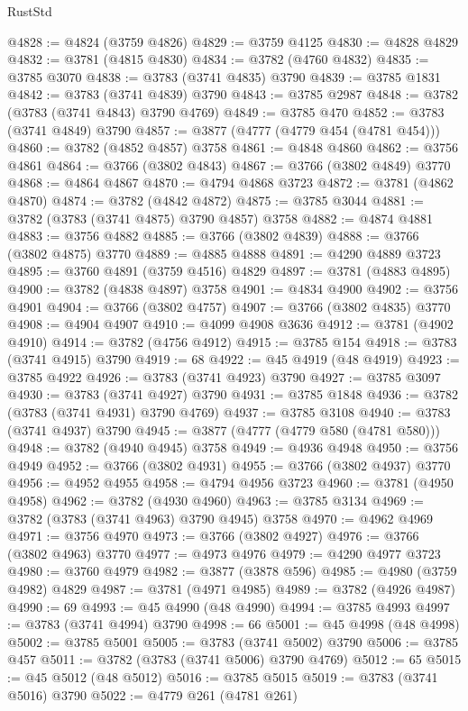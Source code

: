 \begin{lexlean}{RustStd}
\begin{coremodule}
@4828 := @4824 (@3759 @4826)
@4829 := @3759 @4125
@4830 := @4828 @4829
@4832 := @3781 (@4815 @4830)
@4834 := @3782 (@4760 @4832)
@4835 := @3785 @3070
@4838 := @3783 (@3741 @4835) @3790
@4839 := @3785 @1831
@4842 := @3783 (@3741 @4839) @3790
@4843 := @3785 @2987
@4848 := @3782 (@3783 (@3741 @4843) @3790 @4769)
@4849 := @3785 @470
@4852 := @3783 (@3741 @4849) @3790
@4857 := @3877 (@4777 (@4779 @454 (@4781 @454)))
@4860 := @3782 (@4852 @4857) @3758
@4861 := @4848 @4860
@4862 := @3756 @4861
@4864 := @3766 (@3802 @4843)
@4867 := @3766 (@3802 @4849) @3770
@4868 := @4864 @4867
@4870 := @4794 @4868 @3723
@4872 := @3781 (@4862 @4870)
@4874 := @3782 (@4842 @4872)
@4875 := @3785 @3044
@4881 := @3782 (@3783 (@3741 @4875) @3790 @4857) @3758
@4882 := @4874 @4881
@4883 := @3756 @4882
@4885 := @3766 (@3802 @4839)
@4888 := @3766 (@3802 @4875) @3770
@4889 := @4885 @4888
@4891 := @4290 @4889 @3723
@4895 := @3760 @4891 (@3759 @4516) @4829
@4897 := @3781 (@4883 @4895)
@4900 := @3782 (@4838 @4897) @3758
@4901 := @4834 @4900
@4902 := @3756 @4901
@4904 := @3766 (@3802 @4757)
@4907 := @3766 (@3802 @4835) @3770
@4908 := @4904 @4907
@4910 := @4099 @4908 @3636
@4912 := @3781 (@4902 @4910)
@4914 := @3782 (@4756 @4912)
@4915 := @3785 @154
@4918 := @3783 (@3741 @4915) @3790
@4919 := 68
@4922 := @45 @4919 (@48 @4919)
@4923 := @3785 @4922
@4926 := @3783 (@3741 @4923) @3790
@4927 := @3785 @3097
@4930 := @3783 (@3741 @4927) @3790
@4931 := @3785 @1848
@4936 := @3782 (@3783 (@3741 @4931) @3790 @4769)
@4937 := @3785 @3108
@4940 := @3783 (@3741 @4937) @3790
@4945 := @3877 (@4777 (@4779 @580 (@4781 @580)))
@4948 := @3782 (@4940 @4945) @3758
@4949 := @4936 @4948
@4950 := @3756 @4949
@4952 := @3766 (@3802 @4931)
@4955 := @3766 (@3802 @4937) @3770
@4956 := @4952 @4955
@4958 := @4794 @4956 @3723
@4960 := @3781 (@4950 @4958)
@4962 := @3782 (@4930 @4960)
@4963 := @3785 @3134
@4969 := @3782 (@3783 (@3741 @4963) @3790 @4945) @3758
@4970 := @4962 @4969
@4971 := @3756 @4970
@4973 := @3766 (@3802 @4927)
@4976 := @3766 (@3802 @4963) @3770
@4977 := @4973 @4976
@4979 := @4290 @4977 @3723
@4980 := @3760 @4979
@4982 := @3877 (@3878 @596)
@4985 := @4980 (@3759 @4982) @4829
@4987 := @3781 (@4971 @4985)
@4989 := @3782 (@4926 @4987)
@4990 := 69
@4993 := @45 @4990 (@48 @4990)
@4994 := @3785 @4993
@4997 := @3783 (@3741 @4994) @3790
@4998 := 66
@5001 := @45 @4998 (@48 @4998)
@5002 := @3785 @5001
@5005 := @3783 (@3741 @5002) @3790
@5006 := @3785 @457
@5011 := @3782 (@3783 (@3741 @5006) @3790 @4769)
@5012 := 65
@5015 := @45 @5012 (@48 @5012)
@5016 := @3785 @5015
@5019 := @3783 (@3741 @5016) @3790
@5022 := @4779 @261 (@4781 @261)

\end{coremodule}
\end{lexlean}

